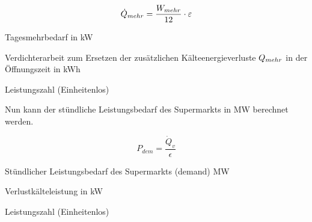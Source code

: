 \begin{equation}
	\pmehr = \frac{\lmehr}{12} \cdot \epsilon
\label{spmehr}
\end{equation}

\begin{description}[\dth]

	\item[$\pmehr$] Tagesmehrbedarf in kW
	\item[$\lmehr$] Verdichterarbeit zum Ersetzen der zus\"atzlichen
	K\"alteenergieverluste $Q_{mehr}$ in der \"Offnungszeit in kWh
	\item[$\epsilon$] Leistungszahl (Einheitenlos)

\end{description}
\vspace{0.5cm}

Nun kann der st\"undliche Leistungsbedarf des Supermarkts in MW berechnet
werden.

\begin{equation}
	P_{dem} = \frac{\dot Q_v}{\epsilon}
\label{pdem}
\end{equation}
\begin{description}[\dth]

	\item[$P_{dem}$] St\"undlicher Leistungsbedarf des Supermarkts (demand)
	MW
	\item[$\dot Q_v$] Verlustk\"alteleistung in kW
	\item[$\epsilon$] Leistungszahl (Einheitenlos)

\end{description}
\vspace{0.5cm}

